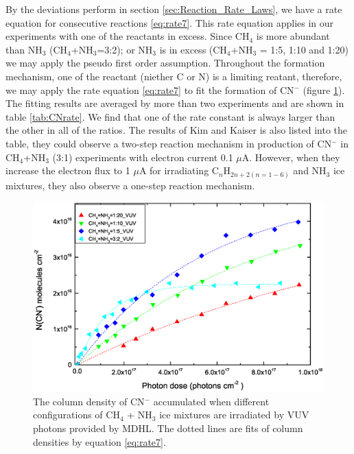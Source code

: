 By the deviations perform in section \ref{sec:Reaction_Rate_Laws}, we have a rate equation for consecutive reactions \ref{eq:rate7}. This rate equation applies in our experiments with one of the reactants in excess. Since CH$_4$ is more abundant than NH$_3$ (CH$_4$+NH$_3$=3:2); or NH$_3$ is in excess (CH$_4$+NH$_3$ = 1:5, 1:10 and 1:20) we may apply the pseudo first order assumption. Throughout the formation mechanism, one of the reactant (niether C or N) is a limiting reatant, therefore, we may apply the rate equation \ref{eq:rate7} to fit the formation of CN$^-$ (figure \ref{fig:CNrate}).\\

The fitting results are averaged by more than two experiments and are shown in table \ref{tab:CNrate}. We find that one of the rate constant is always larger than the other in all of the ratios. The results of Kim and Kaiser is also listed into the table, they could observe a two-step reaction mechanism in production of CN$^-$ in CH$_4$+NH$_3$ (3:1) experiments with electron current 0.1 $\mu$A. However, when they increase the electron flux to 1 $\mu$A for irradiating C$_n$H$_{2n+2 (n=1-6)}$ and NH$_3$ ice mixtures, they also observe a one-step reaction mechanism.

\begin{figure}
\centering
\includegraphics[width=\textwidth]{figures/chapter3/Overall_CN_rate.eps}
\caption{The column density of CN$^-$ accumulated when different configurations of CH$_4$ + NH$_3$ ice mixtures are irradiated by VUV photons provided by MDHL. The dotted lines are fits of column densities by equation \ref{eq:rate7}.}
\label{fig:CNrate}
\end{figure}

